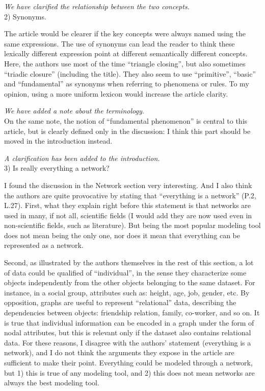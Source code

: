 \documentclass{article}
\begin{document}
\textit{We have clarified the relationship between the two concepts.} \\

2) Synonyms.

The article would be clearer if the key concepts were always named using the same expressions. The use of synonyms can lead the reader to think these lexically different expression point at different semantically different concepts. Here, the authors use most of the time ``triangle closing'', but also sometimes ``triadic closure'' (including the title). They also seem to use ``primitive'', ``basic'' and ``fundamental'' as synonyms when referring to phenomena or rules. To my opinion, using a more uniform lexicon would increase the article clarity.

\textit{We have added a note about the terminology.} \\

On the same note, the notion of ``fundamental phenomenon'' is central to
this article, but is clearly defined only in the discussion: I think
this part should be moved in the introduction instead. 

\textit{A clarification has been added to the introduction.} \\

3) Is really everything a network?

I found the discussion in the Network section very interesting. And I
also think the authors are quite provocative by stating that ``everything
is a network'' (P.2, L.27). First, what they explain right before this
statement is that networks are used in many, if not all, scientific
fields (I would add they are now used even in non-scientific fields,
such as literature). But being the most popular modeling tool does not
mean being the only one, nor does it mean that everything can be
represented as a network. 

Second, as illustrated by the authors themselves in the rest of this
section, a lot of data could be qualified of ``individual'', in the sense
they characterize some objects independently from the other objects
belonging to the same dataset. For instance, in a social group,
attributes such as: height, age, job, gender, etc. By opposition, graphs
are useful to represent ``relational'' data, describing the dependencies
between objects: friendship relation, family, co-worker, and so on. It
is true that individual information can be encoded in a graph under the
form of nodal attributes, but this is relevant only if the dataset also
contains relational data. For these reasons, I disagree with the
authors’ statement (everything is a network), and I do not think the
arguments they expose in the article are sufficient to make their
point. Everything could be modeled through a network, but 1) this is
true of any modeling tool, and 2) this does not mean networks are always
the best modeling tool. 
\end{document}
